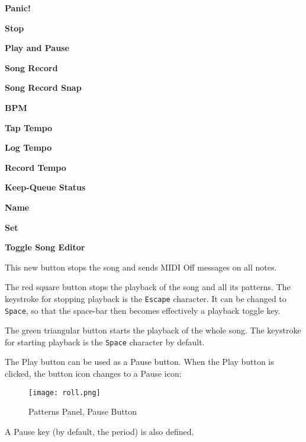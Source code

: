    \begin{enumber}
      \item \textbf{Panic!}
      \item \textbf{Stop}
      \item \textbf{Play and Pause}
      \item \textbf{Song Record}
      \item \textbf{Song Record Snap}
      \item \textbf{BPM}
      \item \textbf{Tap Tempo}
      \item \textbf{Log Tempo}
      \item \textbf{Record Tempo}
      \item \textbf{Keep-Queue Status}
      \item \textbf{Name}
      \item \textbf{Set}
      \item \textbf{Toggle Song Editor}
   \end{enumber}

   \setcounter{ItemCounter}{0}      %

   This new button stops the song and sends MIDI Off messages on all notes.

   The red square button stops the playback of the song and all its patterns.
   The keystroke for stopping playback is the \texttt{Escape} character.
   It can be changed to \texttt{Space}, so that the space-bar then becomes
   effectively a playback toggle key.

   The green triangular button starts the playback of the whole song.
   The keystroke for starting playback is the \texttt{Space} character by
   default.

   The Play button can be used as a Pause button.
   When the Play button is clicked, the button icon changes to a Pause icon:

\begin{figure}[H]
   \centering 
   \texttt{[image: roll.png]}
   \caption{Patterns Panel, Pause Button}
   \label{fig:pattern_window_pause_button}
\end{figure}

   A Pause key (by default, the period) is also defined.

